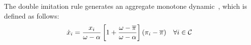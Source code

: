 \documentclass[12pt, onecolumn]{IEEEtran}
\theoremstyle{plain}
\theoremstyle{definition}
\begin{document}
\begin{comment}

\begin{algorithm}
\caption{DISAP: executed at each SU $j$ for each iteration}
\begin{algorithmic}[1]
\STATE \textbf{Initialization}: set the two exogenous parameters $\omega$ and $\alpha$ such that the payoff of SUs falls into the interval $[\alpha,\omega]$, set the imitation factor $\sigma$ and the imitation threshold $\epsilon_U$
\STATE Randomly sample two SUs $j_1$ and $j_2$
\STATE Compute $p_{j_1} =\frac{\sigma}{2}\left[Q(U_j)(U_{j_1}-U_{j_2})+Q(U_{j_2})(U_{j_1}-U_j)\right]^+$, where $[A]^+$ denotes $\max \{0, A\}$ and $Q(U_r)\triangleq\frac{1}{\omega - \alpha}\left(2 - \frac{U_r-\alpha}{\omega - \alpha}\right)$ for SU $r$
\IF{$Q(U_j)(U_{j_1}-U_{j_2})<Q(U_{j_2})(U_j-U_{j_1})$}
\STATE $p_{j_2}=\frac{\sigma}{2}\left[Q(U_{j_1})(U_{j_2}-U_j)+Q(U_{j_2})(U_{j_1}-U_j)\right]^+$
\ELSE
\STATE $p_{j_2}=\frac{\sigma}{2}\left[Q(U_{j_1})(U_{j_2}-U_{j_1})+Q(U_j)(U_{j_2}-U_{j_1})\right]^+$
\ENDIF
\STATE Switch to channel $i_1$ with probability $p_{j_1}$ if $U_j<U_{j_1}-\epsilon_U$, switch to channel $i_2$ with probability $p_{j_2}$ if $U_j<U_{j_2}-\epsilon_U$
\end{algorithmic}
\label{algo:apir}
\end{algorithm}

\end{comment}

\begin{comment}
In our case, $\omega=1$, $\alpha=0$ and $\sigma^*(u_i)=2-u_i$.
As for the simple imitation, we assume that SUs are able to exchange two parameters: utility and strategy.
\end{comment}









The double imitation rule generates an aggregate monotone dynamic~\cite{Schlag99,Sam92}, which is defined as follows:
\begin{equation}
\dot x_i = \frac{x_i}{\omega-\alpha}\left[1+\frac{\omega-\overline{\pi}}{\omega-\alpha}\right](\pi_i-\overline{\pi}) \quad \forall i \in {\cal C}
\label{eq:aggrDyn}
\end{equation}
\end{document}
